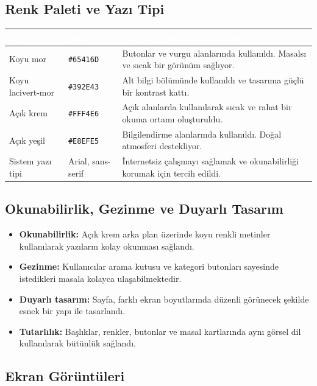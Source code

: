 \documentclass[12pt,a4paper]{article}
\begin{document}
\subsection{Renk Paleti ve Yazı Tipi}
\begin{center}
\begin{tabular}{@{}llp{6.4cm}@{}}
\toprule
\rowcolor{ana}\textcolor{white}{\textbf{Ad}} & \textcolor{white}{\textbf{Kod}} & \textcolor{white}{\textbf{Nerede / neden kullandınız?}} \\
\midrule
Koyu mor & \texttt{\#65416D} & Butonlar ve vurgu alanlarında kullanıldı. Masalsı ve sıcak bir görünüm sağlıyor. \\
Koyu lacivert-mor & \texttt{\#392E43} & Alt bilgi bölümünde kullanıldı ve tasarıma güçlü bir kontrast kattı. \\
Açık krem & \texttt{\#FFF4E6} & Açık alanlarda kullanılarak sıcak ve rahat bir okuma ortamı oluşturuldu. \\
Açık yeşil & \texttt{\#E8EFE5} & Bilgilendirme alanlarında kullanıldı. Doğal atmosferi destekliyor. \\
Sistem yazı tipi & Arial, sans-serif & İnternetsiz çalışmayı sağlamak ve okunabilirliği korumak için tercih edildi. \\
\bottomrule
\end{tabular}
\end{center}

\subsection{Okunabilirlik, Gezinme ve Duyarlı Tasarım}
\begin{itemize}
  \item \textbf{Okunabilirlik:} Açık krem arka plan üzerinde koyu renkli metinler kullanılarak yazıların kolay okunması sağlandı.
\item \textbf{Gezinme:} Kullanıcılar arama kutusu ve kategori butonları sayesinde istedikleri masala kolayca ulaşabilmektedir.
\item \textbf{Duyarlı tasarım:} Sayfa, farklı ekran boyutlarında düzenli görünecek şekilde esnek bir yapı ile tasarlandı.
\item \textbf{Tutarlılık:} Başlıklar, renkler, butonlar ve masal kartlarında aynı görsel dil kullanılarak bütünlük sağlandı.
\end{itemize}

\subsection{Ekran Görüntüleri}
\end{document}

